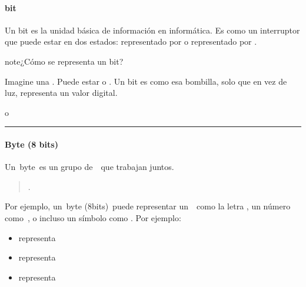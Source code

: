 \documentclass[letterpaper,10pt,spanish]{sphinxmanual}
\begin{document}
\paragraph{bit}
\label{\detokenize{1_guias/8logica/G822:bit}}
\sphinxAtStartPar
Un bit es la unidad básica de información en informática. Es como un interruptor que puede estar en dos estados:  representado por  o  representado por .

\begin{sphinxadmonition}{note}{¿Cómo se representa un bit?}

\sphinxAtStartPar
Imagine una . Puede estar  o .  Un bit es como esa bombilla, solo que en vez de luz, representa un valor digital.

\begin{center} o 
\end{center}\end{sphinxadmonition}


\bigskip\hrule\bigskip



\paragraph{Byte (8 bits)}
\label{\detokenize{1_guias/8logica/G822:byte-8-bits}}
\sphinxAtStartPar
Un byte es un grupo de  que trabajan juntos.
\begin{quote}

\sphinxAtStartPar
{}.
\end{quote}

\sphinxAtStartPar
Por ejemplo, un byte (8bits) puede representar un  como la letra , un número como , o incluso un símbolo como . Por ejemplo:
\begin{itemize}
\item {} 
\sphinxAtStartPar
{} representa 

\item {} 
\sphinxAtStartPar
{} representa 

\item {} 
\sphinxAtStartPar
{} representa \sphinxkeyboard{\sphinxupquote{\#}}

\end{itemize}
\end{document}
